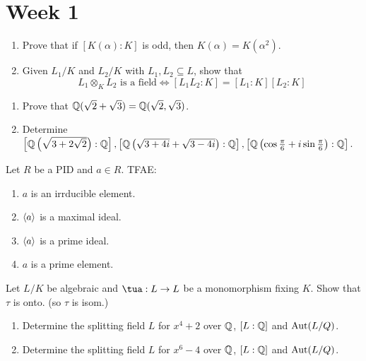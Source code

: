 
\section{Week 1}

\begin{exercise} \mbox{}
  \begin{enumerate}
    \item Prove that if $[K(\alpha) : K]$ is odd, then
      $K(\alpha) = K(\alpha^2)$.
    \item Given $L_1/K$ and $L_2/K$ with $L_1, L_2 \subseteq L$, show that
      \[
        L_1 \otimes_K L_2 \text{~is a field} \iff
        [L_1L_2 : K] = [L_1 : K][L_2 : K]
      \]
  \end{enumerate}
\end{exercise}

\begin{exercise} \mbox{}
  \begin{enumerate}
    \item Prove that $\mathbb{Q}(\sqrt{2} + \sqrt{3}) = \mathbb{Q}(\sqrt{2}, \sqrt{3})$.
    \item Determine $\left[\mathbb{Q}\left(\sqrt{3 + 2\sqrt{2}}\right): \mathbb{Q}\right],
      \left[\mathbb{Q}\left(\sqrt{3 + 4i} + \sqrt{3 - 4i}\right): \mathbb{Q}\right],
      \left[\mathbb{Q}\left(\cos \frac{\pi}{6} + i \sin \frac{\pi}{6}\right): \mathbb{Q}\right]$.
  \end{enumerate}
\end{exercise}

\begin{exercise}
  Let $R$ be a PID and $a \in R$. TFAE:
  \begin{enumerate}
    \item $a$ is an irrducible element.
    \item $\langle a\rangle$ is a maximal ideal.
    \item $\langle a\rangle$ is a prime ideal.
    \item $a$ is a prime element.
  \end{enumerate}
\end{exercise}

\begin{exercise}
  Let $L/K$ be algebraic and $\tua: L \to L$ be a monomorphism fixing $K$.
  Show that $\tau$ is onto. (so $\tau$ is isom.)
\end{exercise}

\begin{exercise} \mbox{}
  \begin{enumerate}
    \item Determine the splitting field $L$ for $x^4 + 2$ over $\mathbb{Q}$,
      $[L : \mathbb{Q}]$ and $\operatorname{Aut}(L/Q)$.
    \item Determine the splitting field $L$ for $x^6 - 4$ over $\mathbb{Q}$,
      $[L : \mathbb{Q}]$ and $\operatorname{Aut}(L/Q)$.
  \end{enumerate}
\end{exercise}

